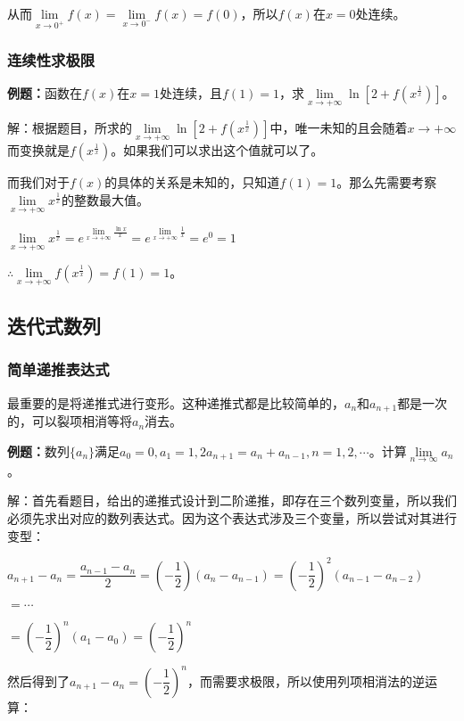 \documentclass[UTF8, 12pt]{ctexart}
\begin{document}
从而$\lim\limits_{x\to 0^+}f(x)=\lim\limits_{x\to 0^-}f(x)=f(0)$，所以$f(x)$在$x=0$处连续。

\subsubsection{连续性求极限}

\textbf{例题：}函数在$f(x)$在$x=1$处连续，且$f(1)=1$，求$\lim\limits_{x\to+\infty}\ln\left[2+f\left(x^{\frac{1}{x}}\right)\right]$。

解：根据题目，所求的$\lim\limits_{x\to+\infty}\ln\left[2+f\left(x^{\frac{1}{x}}\right)\right]$中，唯一未知的且会随着$x\to+\infty$而变换就是$f\left(x^{\frac{1}{x}}\right)$。如果我们可以求出这个值就可以了。

而我们对于$f(x)$的具体的关系是未知的，只知道$f(1)=1$。那么先需要考察$\lim\limits_{x\to+\infty}x^{\frac{1}{x}}$的整数最大值。

$\lim\limits_{x\to+\infty}x^{\frac{1}{x}}=e^{\lim\limits_{x\to+\infty}\frac{\ln x}{x}}=e^{\lim\limits_{x\to+\infty}\frac{1}{x}}=e^0=1$

$\therefore\lim\limits_{x\to+\infty}f(x^{\frac{1}{x}})=f(1)=1$。

\subsection{迭代式数列}

\subsubsection{简单递推表达式}

最重要的是将递推式进行变形。这种递推式都是比较简单的，$a_n$和$a_{n+1}$都是一次的，可以裂项相消等将$a_n$消去。

\textbf{例题：}数列$\{a_n\}$满足$a_0=0,a_1=1,2a_{n+1}=a_n+a_{n-1},n=1,2,\cdots$。计算$\lim\limits_{n\to\infty}a_n$。

解：首先看题目，给出的递推式设计到二阶递推，即存在三个数列变量，所以我们必须先求出对应的数列表达式。因为这个表达式涉及三个变量，所以尝试对其进行变型：

$a_{n+1}-a_n=\dfrac{a_{n-1}-a_n}{2}=\left(-\dfrac{1}{2}\right)(a_n-a_{n-1})=\left(-\dfrac{1}{2}\right)^2(a_{n-1}-a_{n-2})$

$=\cdots$

$=\left(-\dfrac{1}{2}\right)^n(a_1-a_0)=\left(-\dfrac{1}{2}\right)^n$

然后得到了$a_{n+1}-a_n=\left(-\dfrac{1}{2}\right)^n$，而需要求极限，所以使用列项相消法的逆运算：
\end{document}

